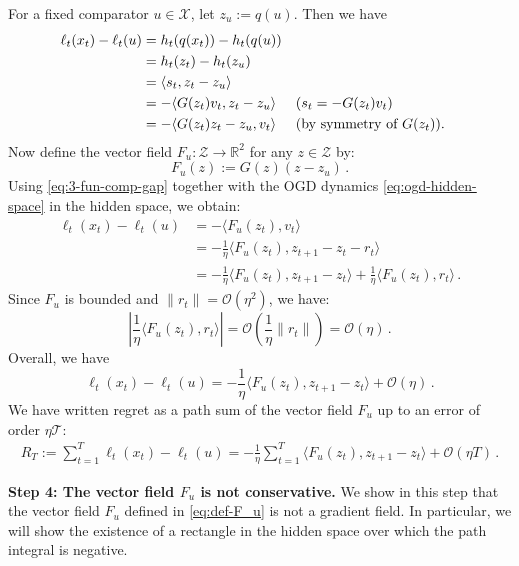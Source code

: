 \documentclass[a4paper,11pt,fullpage]{article}
\theoremstyle{plain}
\theoremstyle{definition}
\theoremstyle{plain}
\begin{document}
For a fixed comparator $u \in \mathcal{X}$, let $z_u := q(u).$ Then we have
\begin{align}
\ell_t(x_t) - \ell_t(u) &= h_t(q(x_t)) - h_t(q(u)) \nonumber\\ 
&= h_t(z_t) - h_t(z_u) \nonumber\\
&= \langle s_t, z_t - z_u \rangle  \nonumber\\
&=  - \langle G(z_t) v_t, z_t - z_u \rangle &&\hfill \text{($s_t = - G(z_t) v_t$)}   \nonumber\\
&= - \langle G(z_t) z_t - z_u, v_t  \rangle &&\hfill \text{(by symmetry of $G(z_t)$)}. \label{eq:3-fun-comp-gap}
\end{align}
Now define the vector field $F_u: \mathcal{Z} \to \mathbb{R}^2$ for any $z \in \mathcal{Z}$ by:
\begin{equation}
\label{eq:def-F_u}
F_u(z) := G(z) (z - z_u)\,.
\end{equation}
Using \eqref{eq:3-fun-comp-gap} together with the OGD dynamics \eqref{eq:ogd-hidden-space} in the hidden space, we obtain: 
\begin{align}
\ell_t(x_t) - \ell_t(u) &= - \langle F_u(z_t), v_t \rangle \nonumber\\
                  &= - \frac{1}{\eta} \langle F_u(z_t), z_{t+1} - z_t - r_t \rangle\nonumber\\ 
                  &= - \frac{1}{\eta} \langle F_u(z_t), z_{t+1} - z_t\rangle + \frac{1}{\eta}  \langle F_u(z_t), r_t \rangle\,.
\end{align}
Since $F_u$ is bounded and $\|r_t\| = \mathcal{O}(\eta^2)$, we have: 
\begin{equation*}
\left| \frac{1}{\eta}  \langle F_u(z_t), r_t \rangle \right| = \mathcal{O}\left(\frac{1}{\eta} \|r_t\|\right) = \mathcal{O}(\eta)\,.
\end{equation*}
Overall, we have 
\begin{equation}
\label{eq:reg-compon-decomp}
\ell_t(x_t) - \ell_t(u) = - \frac{1}{\eta} \langle F_u(z_t), z_{t+1} - z_t\rangle +  \mathcal{O}(\eta)\,.
\end{equation}
We have written regret as a path sum of the vector field $F_u$ up to an error of order $\mathcal{\eta T}$: 
\begin{align}
\label{eq:regret-as-path-sum}
R_T := \sum_{t=1}^T \ell_t(x_t) - \ell_t(u)  
= - \frac{1}{\eta} \sum_{t=1}^T  \langle F_u(z_t), z_{t+1} - z_t\rangle +  \mathcal{O}(\eta T)\,.
\end{align}

\noindent\textbf{Step 4: The vector field $F_u$ is not conservative.} We show in this step that the vector field $F_u$ defined in \eqref{eq:def-F_u} is not a gradient field. In particular, we will show the existence of a rectangle in the hidden space over which the path integral is negative. 
\end{document}
